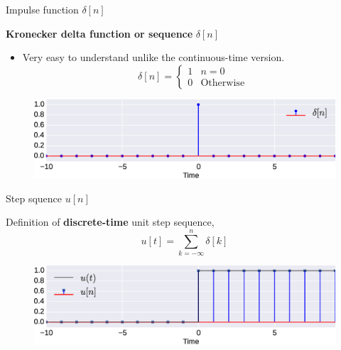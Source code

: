 \documentclass{beamer}
\begin{document}
\begin{frame}[t]{Impulse function $\delta[n]$}

\textbf{Kronecker delta function or sequence} $\delta[n]$

\begin{itemize}
\item Very easy to understand unlike the continuous-time version.
\[ \delta[n] = \begin{cases}
1 & n = 0 \\
0 & \mathrm{Otherwise}
\end{cases} \]
\end{itemize}

\begin{figure}
\includegraphics[width=\textwidth]{img/disc_imp.eps}
\end{figure}
\end{frame}

\begin{frame}[t]{Step squence $u[n]$}

Definition of \textbf{discrete-time} unit step sequence,
\[ u[t] = \sum_{k=-\infty}^{n} \delta[k] \]

\begin{figure}
\includegraphics[width=\textwidth]{img/step.eps}
\end{figure}

\end{frame}
\end{document}
